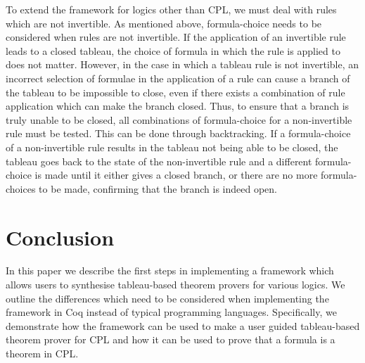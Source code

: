 \documentclass{llncs}
\begin{document}
To extend the framework for logics other than CPL, we must deal with rules
which are not invertible. As mentioned above, formula-choice needs to be
considered when rules are not invertible. If the application of an invertible
rule leads to a closed tableau, the choice of formula in which the rule is
applied to does not matter. However, in the case in which a tableau rule is not
invertible, an incorrect selection of formulae in the application of a rule can
cause a branch of the tableau to be impossible to close, even if there exists a
combination of rule application which can make the branch closed. Thus, to
ensure that a branch is truly unable to be closed, all combinations of
formula-choice for a non-invertible rule must be tested. This can be done
through backtracking. If a formula-choice of a non-invertible rule results in
the tableau not being able to be closed, the tableau goes back to the state of
the non-invertible rule and a different formula-choice is made until it either
gives a closed branch, or there are no more formula-choices to be made,
confirming that the branch is indeed open.
%
\section{Conclusion}
%
In this paper we describe the first steps in implementing a framework which
allows users to synthesise tableau-based theorem provers for various logics.
We outline the differences which need to be considered when implementing the
framework in Coq instead of typical programming languages. Specifically, we
demonstrate how the framework can be used to make a user guided tableau-based
theorem prover for CPL and how it can be used to prove that a formula is a
theorem in CPL.
%


%
\end{document}
